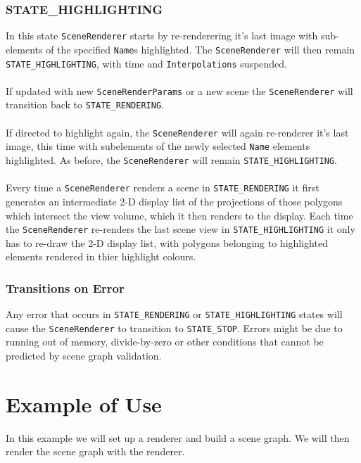 \documentclass[10pt,aps, prb,preprint]{article}
\begin{document}
\subsubsection{STATE\_HIGHLIGHTING}
In this state \texttt{SceneRenderer} starts by re-renderering it's last image with sub-elements of the specified \texttt{Name}s highlighted. The \texttt{SceneRenderer} will then remain \texttt{STATE\_HIGHLIGHTING}, with time and \texttt{Interpolations} suspended.
\\
\\
If updated with new \texttt{SceneRenderParams} or a new scene the \texttt{SceneRenderer} will transition back to \texttt{STATE\_RENDERING}.
\\
\\
If directed to highlight again, the \texttt{SceneRenderer} will again re-renderer it's last image, this time with subelements of the newly selected \texttt{Name} elements highlighted. As before, the \texttt{SceneRenderer} will remain \texttt{STATE\_HIGHLIGHTING}.
\\
\\
Every time a \texttt{SceneRenderer} renders a scene in \texttt{STATE\_RENDERING} it first generates an intermediate 2-D display list of the projections of those polygons which intersect the view volume, which it then renders to the display. Each time the \texttt{SceneRenderer} re-renders the last scene view in \texttt{STATE\_HIGHLIGHTING} it only has to re-draw the 2-D display list, with polygons belonging to highlighted elements rendered in thier highlight colours.

\subsubsection{Transitions on Error}
Any error that occurs in \texttt{STATE\_RENDERING} or \texttt{STATE\_HIGHLIGHTING} states will cause the \texttt{SceneRenderer} to transition to \texttt{STATE\_STOP}. Errors might be due to running out of memory, divide-by-zero or other conditions that cannot be predicted by scene graph validation.


\newpage
\section{Example of Use}
In this example we will set up a renderer and build a scene graph. We will then render the scene graph with the renderer.
\end{document}
